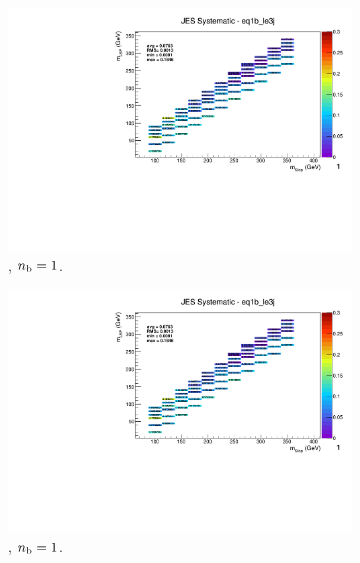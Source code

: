 \begin{figure}[ht!]
\begin{subfigure}[b]{0.32\textwidth}
    \includegraphics[width=\textwidth, page=8]{Figs/sms/t2cc/v37/systs_v2/T2cc_JES_eq1b_le3j.pdf}
    \caption{\njlow, $n_{\text{b}} = 1$.}
  \end{subfigure}
  \begin{subfigure}[b]{0.32\textwidth}
    \includegraphics[width=\textwidth, page=1]{Figs/sms/t2cc/v37/systs_v2/T2cc_JES_eq1b_le3j.pdf}
    \caption{\njlow, $n_{\text{b}} = 1$.}
    \label{fig:sms-jes-t2cc-le3j-1b}
  \end{subfigure}\\
  \begin{subfigure}[b]{0.32\textwidth}

\end{subfigure}
\end{figure}
